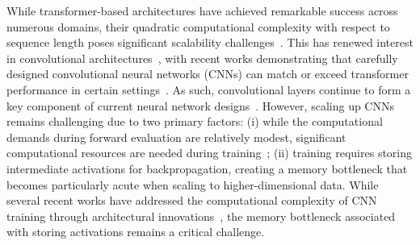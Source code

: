\documentclass[10pt]{article}
\begin{document}
While transformer-based architectures have achieved remarkable success across numerous domains, their quadratic computational complexity with respect to sequence length poses significant scalability challenges~\citep{vaswani2017attention, 10.1145/3530811}. This has renewed interest in convolutional architectures~\citep{10466766}, with recent works demonstrating that carefully designed convolutional neural networks (CNNs) can match or exceed transformer performance in certain settings~\citep{mao2021dual, liu2022convnet, pmlr-v202-cui23d, Cui_2023_ICCV, woo2023convnextv2, wang2023internimage, liu2023slak, 10531070, ding2024unireplknet}. As such, convolutional layers continue to form a key component of current neural network designs~\citep{ronneberger2015u, ding2022scaling, liu2022convnet, wang2024repvit, ma2024starnet}. However, scaling up CNNs remains challenging due to two primary factors: (i) while the computational demands during forward evaluation are relatively modest, significant computational resources are needed during training~\citep{Griewank, ronneberger2015u, chen2016training}; (ii) training requires storing intermediate activations for backpropagation, creating a memory bottleneck that becomes particularly acute when scaling to higher-dimensional data. While several recent works have addressed the computational complexity of CNN training through architectural innovations~\citep{howard2017mobilenets, liu2022convnet, chen2023vanillanet, chen2023fasternet, vasu2023mobileone}, the memory bottleneck associated with storing activations remains a critical challenge.
\end{document}
